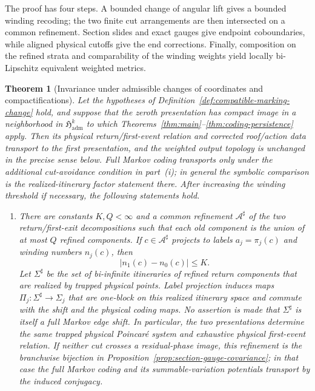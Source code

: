 \documentclass[11pt]{amsart}
\numberwithin{equation}{section}
\newtheorem{theorem}{Theorem}[section]
\theoremstyle{definition}
\theoremstyle{remark}
\begin{document}
The proof has four steps.  A bounded change of angular lift gives a bounded
winding recoding; the two finite cut arrangements are then intersected on
a common refinement.  Section slides and exact gauges give endpoint
coboundaries, while aligned physical cutoffs give the end corrections.
Finally, composition on the refined strata and comparability of the winding
weights yield locally bi-Lipschitz equivalent weighted metrics.

\begin{theorem}[Invariance under admissible changes of coordinates and compactifications]
\label{thm:change-of-marking}
Let the hypotheses of
Definition~\ref{def:compatible-marking-change} hold, and suppose that the
zeroth presentation has compact image in a neighborhood in
$\mathfrak H_{\mathrm{adm}}^k$ to
which Theorems~\ref{thm:main}--\ref{thm:coding-persistence} apply.  Then
its physical return/first-event relation and corrected roof/action data
transport to the first presentation, and the weighted output topology is
unchanged in the precise sense below.  Full Markov coding transports only
under the additional cut-avoidance condition in part~\textup{(i)}; in
general the symbolic comparison is the realized-itinerary factor statement
there.  After increasing the winding threshold if necessary, the following
statements hold.
\begin{enumerate}
\renewcommand{\labelenumi}{\textup{(\roman{enumi})}}
\item There are constants $K,Q<\infty$ and a common refinement
$\mathcal A^\sharp$ of the two return/first-exit decompositions such that
each old component is the union of at most $Q$ refined components.  If
$c\in\mathcal A^\sharp$ projects to labels $a_j=\pi_j(c)$ and winding
numbers $n_j(c)$, then
\begin{equation}\label{eq:bounded-winding-recoding}
 |n_1(c)-n_0(c)|\le K.
\end{equation}
Let $\Sigma^\sharp$ be the set of bi-infinite itineraries of refined return
components that are realized by trapped physical points.  Label projection
induces maps $\Pi_j:\Sigma^\sharp\to\Sigma_j$ that are one-block on this
realized itinerary space and commute with the shift and the physical coding
maps.  No assertion is made that $\Sigma^\sharp$ is itself a full Markov
edge shift.  In particular, the two presentations determine the same
trapped physical Poincar\'e system and exhaustive physical first-event
relation.
If neither cut crosses a residual-phase image, this refinement is the
branchwise bijection in
Proposition~\ref{prop:section-gauge-covariance}; in that case the full
Markov coding and its summable-variation potentials transport by the
induced conjugacy.


\end{enumerate}
\end{theorem}
\end{document}
